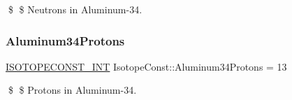 \$ \$ Neutrons in Aluminum-\/34. \mbox{\label{group___isotope_const-_aluminum-_al34_gad10ebc4275253697f0fc5d282fd31bd5}} 
\subsubsection{\texorpdfstring{Aluminum34\+Protons}{Aluminum34Protons}}
{\footnotesize\ttfamily \mbox{\hyperlink{group___isotope_const-_macros_ga5f18360b3e99483a35c32d789e62621c}{I\+S\+O\+T\+O\+P\+E\+C\+O\+N\+S\+T\+\_\+\+I\+NT}} Isotope\+Const\+::\+Aluminum34\+Protons = 13}

\$ \$ Protons in Aluminum-\/34. 